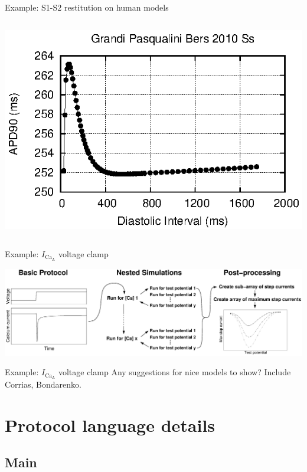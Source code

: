 \documentclass[t,xcolor={usenames,dvipsnames}]{beamer}
\begin{document}
\begin{frame}{Example: S1-S2 restitution on human models}
\begin{columns}[T]
\begin{column}{.33\linewidth}
\begin{center}
\vspace{.1cm}
\includegraphics[width=\textwidth]{grandi_pasqualini_bers_2010_ss_s1s2_curve}
\end{center}
\end{column}
\end{columns}
\end{frame}

\begin{frame}{Example: $I_{\textrm{Ca}_L}$ voltage clamp}
\begin{center}
\includegraphics[width=\textwidth]{ICaLIntro}
\end{center}
\end{frame}

\begin{frame}{Example: $I_{\textrm{Ca}_L}$ voltage clamp}
Any suggestions for nice models to show?
Include Corrias, Bondarenko.
\end{frame}

\section{Protocol language details}
\subsection*{Main}
\end{document}
